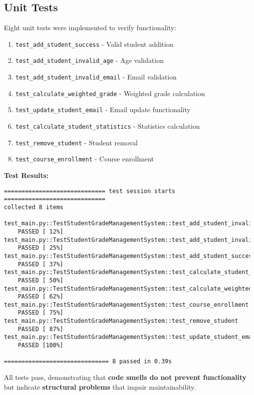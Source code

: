 \documentclass[11pt,a4paper]{article}
\begin{document}
\subsection{Unit Tests}

Eight unit tests were implemented to verify functionality:

\begin{enumerate}[noitemsep]
    \item \texttt{test\_add\_student\_success} - Valid student addition
    \item \texttt{test\_add\_student\_invalid\_age} - Age validation
    \item \texttt{test\_add\_student\_invalid\_email} - Email validation
    \item \texttt{test\_calculate\_weighted\_grade} - Weighted grade calculation
    \item \texttt{test\_update\_student\_email} - Email update functionality
    \item \texttt{test\_calculate\_student\_statistics} - Statistics calculation
    \item \texttt{test\_remove\_student} - Student removal
    \item \texttt{test\_course\_enrollment} - Course enrollment
\end{enumerate}

\textbf{Test Results:}
\begin{verbatim}
============================= test session starts =============================
collected 8 items

test_main.py::TestStudentGradeManagementSystem::test_add_student_invalid_age 
    PASSED [ 12%]
test_main.py::TestStudentGradeManagementSystem::test_add_student_invalid_email 
    PASSED [ 25%]
test_main.py::TestStudentGradeManagementSystem::test_add_student_success 
    PASSED [ 37%]
test_main.py::TestStudentGradeManagementSystem::test_calculate_student_statistics 
    PASSED [ 50%]
test_main.py::TestStudentGradeManagementSystem::test_calculate_weighted_grade 
    PASSED [ 62%]
test_main.py::TestStudentGradeManagementSystem::test_course_enrollment 
    PASSED [ 75%]
test_main.py::TestStudentGradeManagementSystem::test_remove_student 
    PASSED [ 87%]
test_main.py::TestStudentGradeManagementSystem::test_update_student_email 
    PASSED [100%]

============================== 8 passed in 0.39s
\end{verbatim}

All tests pass, demonstrating that \textbf{code smells do not prevent functionality} but indicate \textbf{structural problems} that impair maintainability.
\end{document}
